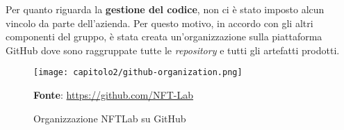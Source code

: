 Per quanto riguarda la \textbf{gestione del codice}, non ci è stato imposto alcun vincolo da parte dell'azienda. Per questo motivo, in accordo con gli altri componenti del gruppo, è stata creata un'organizzazione sulla piattaforma GitHub dove sono raggruppate tutte le \textit{repository} e tutti gli artefatti prodotti.


\begin{figure}[!h]
  \centering
  \texttt{[image: capitolo2/github-organization.png]}
  \caption{Organizzazione NFTLab su GitHub}
  \textbf{Fonte}: \href{https://github.com/NFT-Lab}{https://github.com/NFT-Lab}
\end{figure}
